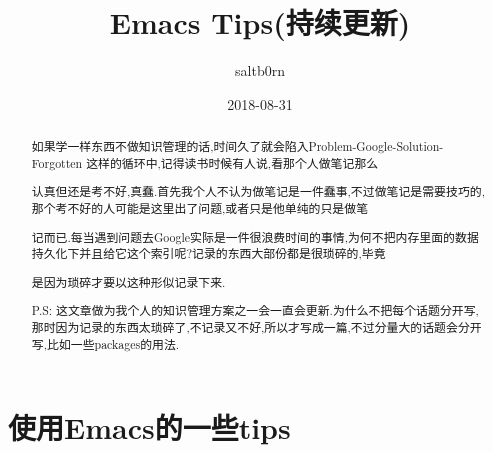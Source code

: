 \documentclass[11pt]{article}
\author{saltb0rn}
\date{2018-08-31}
\title{Emacs Tips(持续更新)}
\begin{document}
\maketitle
\tableofcontents

\begin{abstract}
如果学一样东西不做知识管理的话,时间久了就会陷入Problem-Google-Solution-Forgotten 这样的循环中,记得读书时候有人说,看那个人做笔记那么

认真但还是考不好,真蠢.首先我个人不认为做笔记是一件蠢事,不过做笔记是需要技巧的,那个考不好的人可能是这里出了问题,或者只是他单纯的只是做笔

记而已.每当遇到问题去Google实际是一件很浪费时间的事情,为何不把内存里面的数据持久化下并且给它这个索引呢?记录的东西大部份都是很琐碎的,毕竟

是因为琐碎才要以这种形似记录下来.

P.S: 这文章做为我个人的知识管理方案之一会一直会更新.为什么不把每个话题分开写,那时因为记录的东西太琐碎了,不记录又不好,所以才写成一篇,不过分量大的话题会分开写,比如一些packages的用法.
\end{abstract}

\section{使用Emacs的一些tips}
\label{sec:org746168d}
\end{document}
